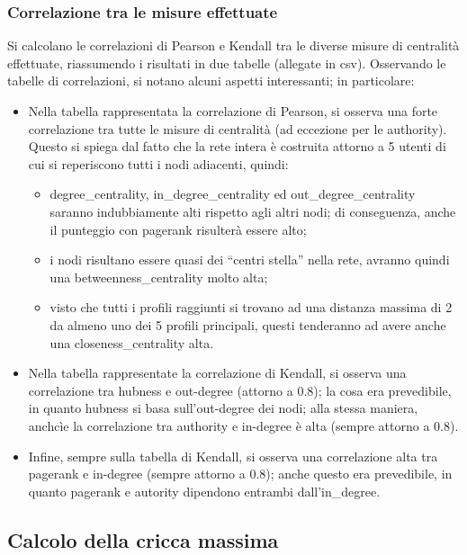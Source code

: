 \documentclass[a4paper, 12pt, twoside]{article}
\begin{document}
\subsubsection{Correlazione tra le misure effettuate}
Si calcolano le correlazioni di Pearson e Kendall  tra le diverse misure di centralità effettuate, riassumendo i risultati in due tabelle (allegate in csv). 
Osservando le tabelle di correlazioni, si notano alcuni aspetti interessanti; in particolare:
\begin{itemize}
    \item Nella tabella rappresentata la correlazione di Pearson, si osserva una forte correlazione tra tutte le misure di centralità (ad eccezione per le authority). Questo si spiega dal fatto che la rete intera è costruita attorno a 5 utenti di cui si reperiscono tutti i nodi adiacenti, quindi:
        \begin{itemize}
            \item degree\_centrality, in\_degree\_centrality ed out\_degree\_centrality saranno indubbiamente alti rispetto agli altri nodi; di conseguenza, anche il punteggio con pagerank risulterà essere alto;
            \item i nodi risultano essere quasi dei “centri stella” nella rete, avranno quindi una betweenness\_centrality molto alta;
            \item visto che tutti i profili raggiunti si trovano ad una distanza massima di 2 da almeno uno dei 5 profili principali, questi tenderanno ad avere anche una closeness\_centrality alta.
    \end{itemize}
    \item Nella tabella rappresentate la correlazione di Kendall, si osserva una correlazione tra  hubness e out-degree (attorno a 0.8); la cosa era prevedibile, in quanto hubness si basa sull'out-degree dei nodi; alla stessa maniera, anchcìe la correlazione tra authority e in-degree è alta (sempre attorno a 0.8).
    \item Infine, sempre sulla tabella di Kendall, si osserva una correlazione alta tra pagerank e in-degree (sempre attorno a 0.8); anche questo era prevedibile, in quanto pagerank e autority dipendono entrambi dall’in\_degree.
\end{itemize}


\subsection{Calcolo della cricca massima}
\end{document}
